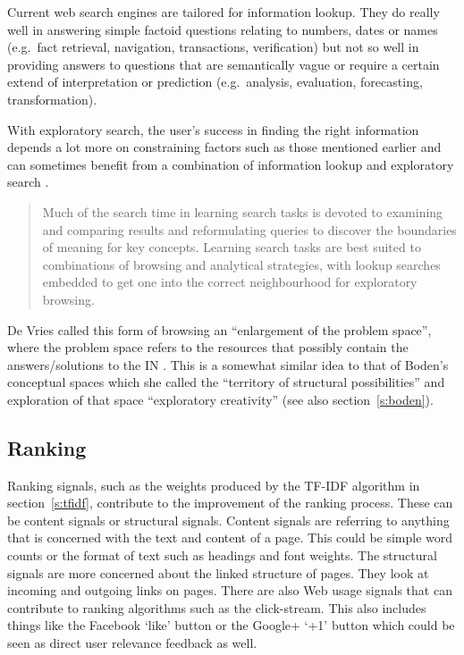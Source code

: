 Current web search engines are tailored for information lookup. They do really well in answering simple factoid questions relating to numbers, dates or names (e.g.\ fact retrieval, navigation, transactions, verification) but not so well in providing answers to questions that are semantically vague or require a certain extend of interpretation or prediction (e.g.\ analysis, evaluation, forecasting, transformation).

With exploratory search, the user’s success in finding the right information depends a lot more on constraining factors such as those mentioned earlier and can sometimes benefit from a combination of information lookup and exploratory search \autocite{Marchionini2006}.

\begin{quotation}
  Much of the search time in learning search tasks is devoted to examining and comparing results and reformulating queries to discover the boundaries of meaning for key concepts. Learning search tasks are best suited to combinations of browsing and analytical strategies, with lookup searches embedded to get one into the correct neighbourhood for exploratory browsing. 
\end{quotation}

De Vries called this form of browsing an ``enlargement of the problem space'', where the problem space refers to the resources that possibly contain the answers/solutions to the \ac{IN} \autocite*{DeVries1993}. This is a somewhat similar idea to that of Boden's conceptual spaces which she called the ``territory of structural possibilities'' and exploration of that space ``exploratory creativity'' \autocite{Boden2003} (see also section~\ref{s:boden}).



\subsection{Ranking}
\label{s:ranking}

Ranking signals, such as the weights produced by the \ac{TF}-\ac{IDF} algorithm in section~\ref{s:tfidf}, contribute to the improvement of the ranking process. These can be content signals or structural signals. Content signals are referring to anything that is concerned with the text and content of a page. This could be simple word counts or the format of text such as headings and font weights. The structural signals are more concerned about the linked structure of pages. They look at incoming and outgoing links on pages. There are also Web usage signals that can contribute to ranking algorithms such as the click-stream. This also includes things like the Facebook `like' button or the Google+ `+1' button which could be seen as direct user relevance feedback as well.

